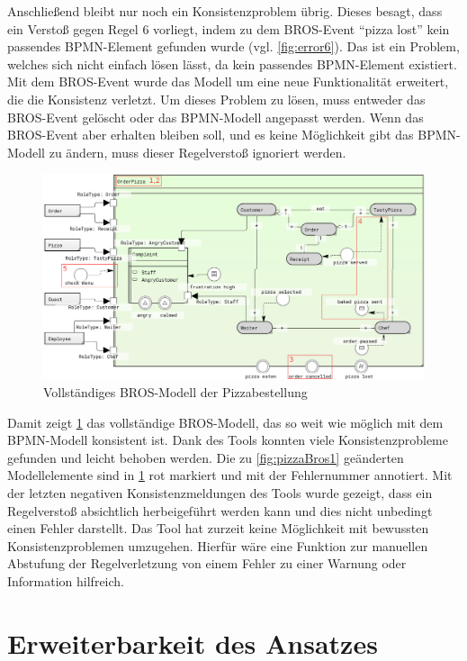 Anschließend bleibt nur noch ein Konsistenzproblem übrig.
Dieses besagt, dass ein Verstoß gegen Regel 6 vorliegt, indem zu dem BROS-Event ``pizza lost'' kein passendes BPMN-Element gefunden wurde (vgl. \cref{fig:error6}).
Das ist ein Problem, welches sich nicht einfach lösen lässt, da kein passendes BPMN-Element existiert.
Mit dem BROS-Event wurde das Modell um eine neue Funktionalität erweitert, die die Konsistenz verletzt.
Um dieses Problem zu lösen, muss entweder das BROS-Event gelöscht oder das BPMN-Modell angepasst werden.
Wenn das BROS-Event aber erhalten bleiben soll, und es keine Möglichkeit gibt das BPMN-Modell zu ändern, muss dieser Regelverstoß ignoriert werden.

\begin{figure}
    \centering
    \includegraphics[width=\textwidth,keepaspectratio]{../images/example/bros-rule6H.png}%
    \caption{Vollständiges BROS-Modell der Pizzabestellung}%
    \label{fig:pizzaBros6}
\end{figure}

Damit zeigt \cref{fig:pizzaBros6} das vollständige BROS-Modell, das so weit wie möglich mit dem BPMN-Modell konsistent ist.
Dank des Tools konnten viele Konsistenzprobleme gefunden und leicht behoben werden.
Die zu \cref{fig:pizzaBros1} geänderten Modellelemente sind in \cref{fig:pizzaBros6} rot markiert und mit der Fehlernummer annotiert.
Mit der letzten negativen Konsistenzmeldungen des Tools wurde gezeigt, dass ein Regelverstoß absichtlich herbeigeführt werden kann und dies nicht unbedingt einen Fehler darstellt.
Das Tool hat zurzeit keine Möglichkeit mit bewussten Konsistenzproblemen umzugehen.
Hierfür wäre eine Funktion zur manuellen Abstufung der Regelverletzung von einem Fehler zu einer Warnung oder Information hilfreich.

\section{Erweiterbarkeit des Ansatzes}


